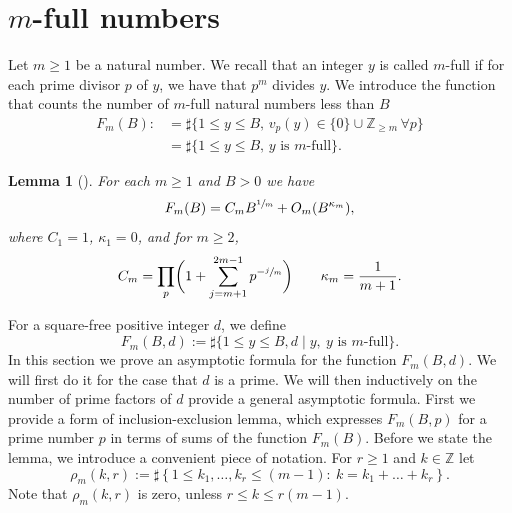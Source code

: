 \documentclass[11pt]{article}
\numberwithin{equation}{section}
\let\kap\kappa
\newcommand\ZZ{\mathbb{Z}}
\newcommand{\Z}{\mathbb{Z}}
\newtheorem{lemma}[theorem]{Lemma}
\theoremstyle{definition}
\numberwithin{theorem}{section}
\begin{document}
\section{\texorpdfstring{$m$}{m}-full numbers}
\label{sec:m-full}
Let $m\geq 1$ be a natural number. We recall that an integer $y$ is called $m$-full if for each prime divisor $p$ of $y$, we have that $p^m$ divides $y$.
We introduce the function that counts the number of $m$-full natural numbers less than $B$
\begin{equation*}
\begin{split}
F_m(B):\!&=\sharp\{1\leq y\leq B,\, v_p(y)\in\{0\}\cup\ZZ_{\geq m}\,\forall p\}\\
&= \sharp\{1\leq y\leq B,\, y \mbox{ is $m$-full}\}.
\end{split}
\end{equation*}

\begin{lemma}[{\cite{erdos, MR0095804}}]
For each $m\geq 1$ and $B>0$ we have
\begin{equation}\label{eqnm}
F_m(B)=C_mB^{\sfrac{1}{m}}+O_m(B^{\kap_m}),
\end{equation}
where $C_1=1$, $\kap_1=0$, and for $m\geq 2$,
\begin{equation}
\label{eq:C_m_explicit}
C_m=\prod_p\biggl(1+\sum_{j=m+1}^{2m-1}p^{-\sfrac jm}\biggr) \qquad
\kap_m=\frac1{m+1}.
\end{equation}
\end{lemma}

For a square-free positive integer $d$, we define
\begin{equation}
\label{eq:FmBd_defin}
F_m(B,d):= \sharp\{1\leq y\leq B, d\mid y,\ y\mbox{ is $m$-full}\}.
\end{equation}
In this section we prove an asymptotic formula for the function $F_m(B,d)$.
We will first do it for the case that $d$ is a prime. We will then inductively on the number of prime factors of $d$ provide a general asymptotic formula.
First we provide a form of inclusion-exclusion lemma, which expresses $F_m(B,p)$ for a prime number $p$ in terms of sums of the function $F_m(B)$. Before we state the lemma, we introduce a convenient piece of notation. For $r\geq 1$ and $k\in \Z$ let
\[
\rho_m(k,r):= \sharp\left\{1\leq k_1,\ldots, k_r\leq (m-1):\ k=k_1+\ldots + k_r\right\}.
\]
Note that $\rho_m(k,r)$ is zero, unless $r\leq k\leq r(m-1)$.\par
\end{document}
